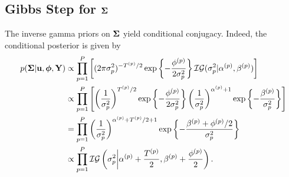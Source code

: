 \documentclass[12pt]{article}
\newcommand{\bphi}{\boldsymbol{\phi}}
\begin{document}
\subsection{Gibbs Step for $\boldsymbol{\Sigma}$}
The inverse gamma priors on $\boldsymbol{\Sigma}$ yield conditional conjugacy. Indeed, the conditional posterior is given by 
\begin{align*}
p(\CovObs | \bpar, \bphi, \stateMat) 
&\propto \prod_{\objIdx=1}^{\Nobj} \left[(2\pi\sdObs^2_{\objIdx})^{-\indexObj{\Ntime}/2} \exp\left\{-\frac{\indexObj{\phi} }{2\sdObs^2_{\objIdx}} \right\} 
\mathcal{IG}(\sdObs^2_{\objIdx}| \indexObj{\IGShape}, \indexObj{\IGScale}) \right] \\
&\propto \prod_{\objIdx=1}^{\Nobj} \left[\left(\frac{1}{\sdObs^2_{\objIdx}}\right)^{\indexObj{\Ntime}/2} \exp\left\{-\frac{\indexObj{\phi} }{2\sdObs^2_{\objIdx}} \right\} 
 \left(\frac{1}{\sdObs^2_{\objIdx}}\right)^{\indexObj{\IGShape}+1} \exp\left\{-\frac{\indexObj{\IGScale}}{\sdObs^2_{\objIdx}} \right\}\right] \\
 &= \prod_{\objIdx=1}^{\Nobj} \left(\frac{1}{\sdObs^2_{\objIdx}}\right)^{\indexObj{\IGShape}+\indexObj{\Ntime}/2+1} \exp\left\{-\frac{\indexObj{\IGScale} + \indexObj{\phi}/2}{\sdObs^2_{\objIdx}} \right\} \\
 &\propto \prod_{\objIdx=1}^{\Nobj} \mathcal{IG}\left(\sdObs^2_{\objIdx} \bigg| \indexObj{\IGShape} + \frac{\indexObj{\Ntime}}{2}, \indexObj{\IGScale} + \frac{\indexObj{\phi}}{2} \right).
\end{align*}


\end{document}
